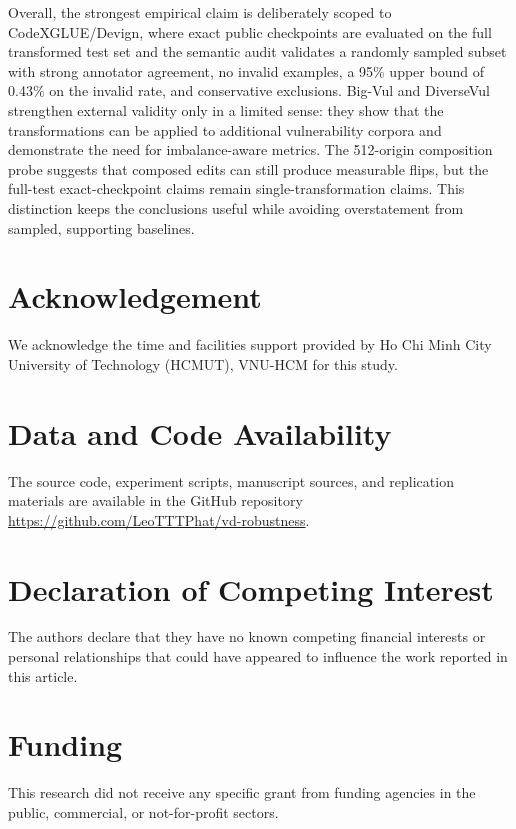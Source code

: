 \documentclass[a4paper,fleqn]{cas-dc}
\begin{document}
Overall, the strongest empirical claim is deliberately scoped to
CodeXGLUE/Devign, where exact public checkpoints are evaluated on the full
transformed test set and the semantic audit validates a randomly sampled
subset with strong annotator agreement, no invalid examples, a 95\% upper
bound of 0.43\% on the invalid rate, and conservative exclusions. Big-Vul and DiverseVul
strengthen external validity only in a limited sense: they show that the
transformations can be applied to additional vulnerability corpora and
demonstrate the need for imbalance-aware metrics. The 512-origin composition
probe suggests that composed edits can still produce measurable flips, but the
full-test exact-checkpoint claims remain single-transformation claims. This
distinction keeps the conclusions useful while avoiding overstatement from
sampled, supporting baselines.

\section*{Acknowledgement}

We acknowledge the time and facilities support provided by Ho Chi Minh City
University of Technology (HCMUT), VNU-HCM for this study.

\section*{Data and Code Availability}

The source code, experiment scripts, manuscript sources, and replication
materials are available in the GitHub repository
\href{https://github.com/LeoTTTPhat/vd-robustness}{https://github.com/LeoTTTPhat/vd-robustness}.

\section*{Declaration of Competing Interest}

The authors declare that they have no known competing financial interests or
personal relationships that could have appeared to influence the work reported
in this article.

\section*{Funding}

This research did not receive any specific grant from funding agencies in the
public, commercial, or not-for-profit sectors.



\end{document}
